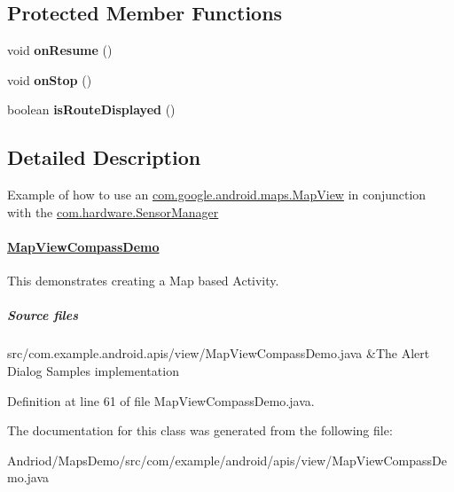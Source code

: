 \subsection*{Protected Member Functions}
\begin{DoxyCompactItemize}
\item 
\hypertarget{classcom_1_1example_1_1android_1_1apis_1_1view_1_1_map_view_compass_demo_a14768c382cfd134f7688413a3eb56d08}{void {\bfseries on\-Resume} ()}\label{classcom_1_1example_1_1android_1_1apis_1_1view_1_1_map_view_compass_demo_a14768c382cfd134f7688413a3eb56d08}

\item 
\hypertarget{classcom_1_1example_1_1android_1_1apis_1_1view_1_1_map_view_compass_demo_a458397229d0b2076a739955b1cb8be35}{void {\bfseries on\-Stop} ()}\label{classcom_1_1example_1_1android_1_1apis_1_1view_1_1_map_view_compass_demo_a458397229d0b2076a739955b1cb8be35}

\item 
\hypertarget{classcom_1_1example_1_1android_1_1apis_1_1view_1_1_map_view_compass_demo_a294a4986d39cff22365b36850bb2a0ca}{boolean {\bfseries is\-Route\-Displayed} ()}\label{classcom_1_1example_1_1android_1_1apis_1_1view_1_1_map_view_compass_demo_a294a4986d39cff22365b36850bb2a0ca}

\end{DoxyCompactItemize}


\subsection{Detailed Description}
Example of how to use an \hyperlink{}{com.\-google.\-android.\-maps.\-Map\-View} in conjunction with the \hyperlink{}{com.\-hardware.\-Sensor\-Manager} \paragraph*{\hyperlink{classcom_1_1example_1_1android_1_1apis_1_1view_1_1_map_view_compass_demo}{Map\-View\-Compass\-Demo}}

This demonstrates creating a Map based Activity.

\subparagraph*{Source files}

\begin{TabularC}{2}
\hline
src/com.\-example.\-android.\-apis/view/\-Map\-View\-Compass\-Demo.java &The Alert Dialog Samples implementation  \\
\end{TabularC}


Definition at line 61 of file Map\-View\-Compass\-Demo.\-java.



The documentation for this class was generated from the following file\-:\begin{DoxyCompactItemize}
\item 
Andriod/\-Maps\-Demo/src/com/example/android/apis/view/Map\-View\-Compass\-Demo.\-java\end{DoxyCompactItemize}
